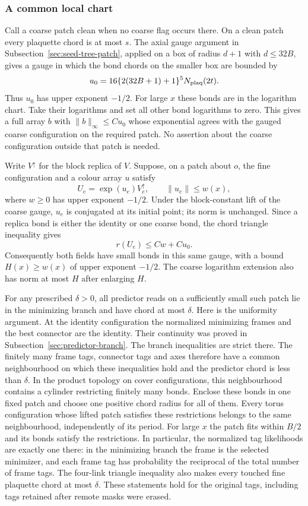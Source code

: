 \subsubsection{A common local chart}
Call a coarse patch clean when no coarse flag occurs there. On a
clean patch every plaquette chord is at most $s$. The axial gauge
argument in Subsection~\ref{sec:seed-tree-patch}, applied on a box of
radius $d+1$ with $d\le32B$, gives a gauge in which the bond chords
on the smaller box are bounded by
\[
 u_0=16\{2(32B+1)+1\}^{5}N_{\rm plaq}(2t).
\]
Thus $u_0$ has upper exponent $-1/2$. For large $x$ these bonds
are in the logarithm chart. Take their logarithms and set all other
bond logarithms to zero. This gives a full array $b$ with
$\|b\|_\infty\le C u_0$ whose exponential agrees with the gauged
coarse configuration on the required patch. No assertion about the
coarse configuration outside that patch is needed.

Write $V^\uparrow$ for the block replica of $V$. Suppose, on a
patch about $o$, the fine configuration and a colour array $u$
satisfy
\begin{equation}\label{eq:annulus-graft}
 U_e=\exp(u_e)V^\uparrow_e,\qquad \|u_e\|\le w(x),
\end{equation}
where $w\ge0$ has upper exponent $-1/2$. Under the block-constant
lift of the coarse gauge, $u_e$ is conjugated at its initial point;
its norm is unchanged. Since a replica bond is either the identity
or one coarse bond, the chord triangle inequality gives
\[
 r(U_e)\le Cw+Cu_0.
\]
Consequently both fields have small bonds in this same gauge, with
a bound $H(x)\ge w(x)$ of upper exponent $-1/2$. The coarse
logarithm extension also has norm at most $H$ after enlarging $H$.

For any prescribed $\delta>0$, all predictor reads on a sufficiently
small such patch lie in the minimizing branch and have chord at
most $\delta$. Here is the uniformity argument. At the identity
configuration the normalized minimizing frames and the best
connector are the identity. Their continuity was proved in
Subsection~\ref{sec:predictor-branch}. The branch inequalities are
strict there. The finitely many frame tags, connector tags and axes
therefore have a common neighbourhood on which these inequalities
hold and the predictor chord is less than $\delta$.
In the product topology on cover configurations, this neighbourhood
contains a cylinder restricting finitely many bonds. Enclose these
bonds in one fixed patch and choose one positive chord radius for
all of them. Every torus configuration whose lifted patch satisfies
these restrictions belongs to the same neighbourhood, independently
of its period. For large $x$ the patch fits within $B/2$ and its
bonds satisfy the restrictions. In particular, the normalized tag
likelihoods are exactly one there: in the minimizing branch the frame
is the selected minimizer, and each frame tag has probability the
reciprocal of the total number of frame tags.
The four-link triangle inequality also makes every touched fine
plaquette chord at most $\delta$. These statements hold for the
original tags, including tags retained after remote masks were erased.


